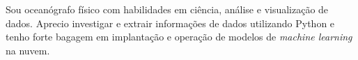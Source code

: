 \documentclass[9pt]{developercv} %
\begin{document}

\begin{minipage}[t]{1\textwidth} %
Sou oceanógrafo físico com habilidades em ciência, análise e visualização de dados. Aprecio investigar e extrair informações de dados utilizando Python e tenho forte bagagem em implantação e operação de modelos de \textit{machine learning} na nuvem. 
\end{minipage}
\hspace{0.3cm}
\hfill %

\begin{center}
\end{center}

\vspace{-0.2cm}
\end{document}
